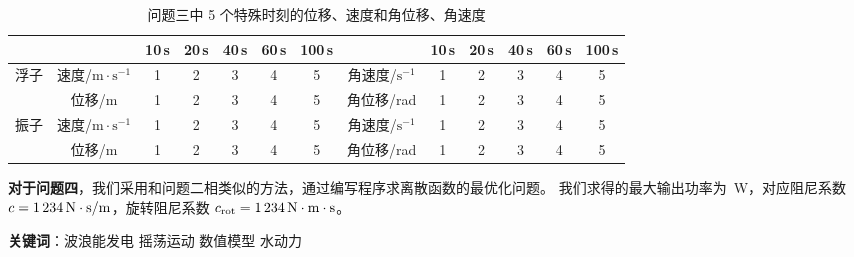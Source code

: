 \begin{table}[htbp]
    \centering
    \scriptsize
    \begin{tabular}{ccccccccccccc}
        \toprule
        & & 10\,s & 20\,s & 40\,s & 60\,s & 100\,s & & 10\,s & 20\,s & 40\,s & 60\,s & 100\,s \\
        \midrule
        \multirow{2}{*}{浮子} & 速度/$\mathrm{m}\cdot\mathrm{s}^{-1}$ & 1 & 2 & 3 & 4 & 5 & 角速度/$\mathrm{s}^{-1}$ & 1 & 2 & 3 & 4 & 5 \\
        & 位移/$\mathrm{m}$ & 1 & 2 & 3 & 4 & 5 & 角位移/rad & 1 & 2 & 3 & 4 & 5 \\  
        \multirow{2}{*}{振子} & 速度/$\mathrm{m}\cdot\mathrm{s}^{-1}$ & 1 & 2 & 3 & 4 & 5 & 角速度/$\mathrm{s}^{-1}$ & 1 & 2 & 3 & 4 & 5 \\
        & 位移/$\mathrm{m}$ & 1 & 2 & 3 & 4 & 5 & 角位移/rad & 1 & 2 & 3 & 4 & 5 \\  
        \bottomrule
    \end{tabular}
    \caption{问题三中 5 个特殊时刻的位移、速度和角位移、角速度}
    \label{answer-3}
\end{table}

\textbf{对于问题四}，我们采用和问题二相类似的方法，通过编写程序求离散函数的最优化问题。
我们求得的最大输出功率为 \,W，对应阻尼系数 $c=\N{1234}\,\mathrm{N}\cdot\mathrm{s}/\mathrm{m}$，旋转阻尼系数 $c_\text{rot}=\N{1234}\,\mathrm{N}\cdot\mathrm{m}\cdot\mathrm{s}$。

\vfill

\textbf{关键词}：波浪能发电 \hspace{1em} 摇荡运动 \hspace{1em} 数值模型 \hspace{1em} 水动力